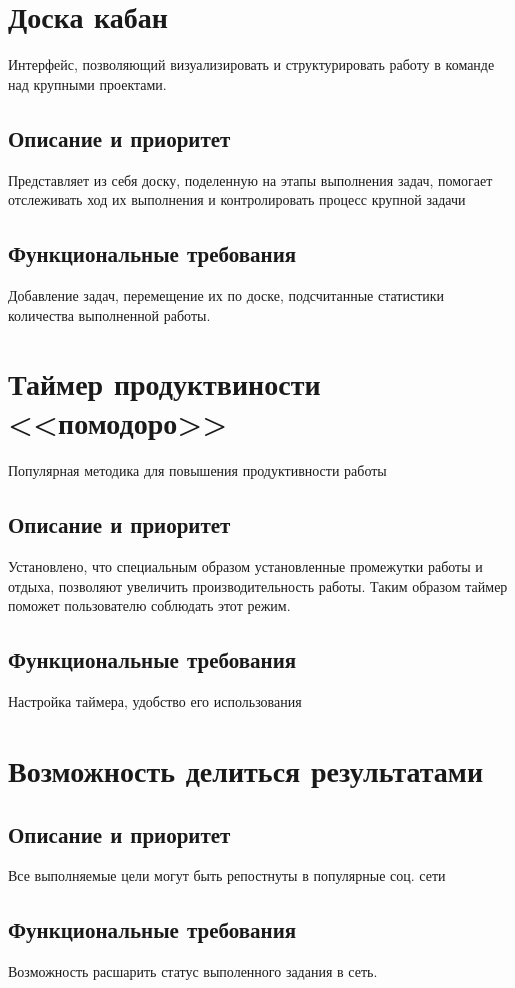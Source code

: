 \section{Доска кабан}
Интерфейс, позволяющий визуализировать и структурировать работу в команде над крупными проектами.

\subsection{Описание и приоритет}
Представляет из себя доску, поделенную на этапы выполнения задач, помогает отслеживать ход их выполнения и контролировать процесс крупной задачи

\subsection{Функциональные требования}
Добавление задач, перемещение их по доске, подсчитанные статистики количества выполненной работы.

\section{Таймер продуктвиности <<помодоро>>}
Популярная методика для повышения продуктивности работы

\subsection{Описание и приоритет}
Установлено, что специальным образом установленные промежутки работы и отдыха, позволяют увеличить производительность работы. Таким образом таймер поможет пользователю соблюдать этот режим.

\subsection{Функциональные требования}
Настройка таймера, удобство его использования

\section{Возможность делиться результатами}

\subsection{Описание и приоритет}
Все выполняемые цели могут быть репостнуты в популярные соц. сети

\subsection{Функциональные требования}
Возможность расшарить статус выполенного задания в сеть.